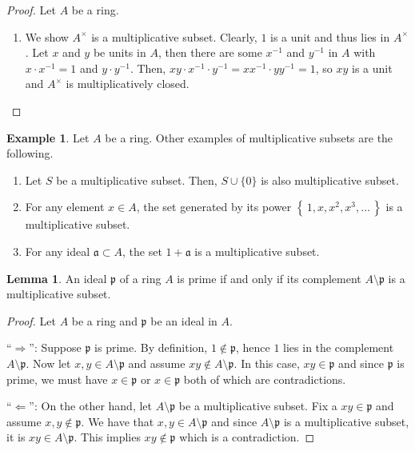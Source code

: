 \documentclass[a4paper]{book}
\theoremstyle{definition}
\newtheorem{example}{Example}[definition]
\newtheorem{lemma}[definition]{Lemma}
\newcommand{\set}[1]{\left\{\, #1 \,\right\}}
\begin{document}
\begin{proof}
    Let \(A\) be a ring.
    \begin{enumerate}
        \item We show \(A^\times\) is a multiplicative subset. Clearly, \(1\) is a unit and thus lies in \(A^\times\). Let \(x\) and \(y\) be units in \(A\), then there are some \(x^{-1}\) and \(y^{-1}\) in \(A\) with \(x \cdot x^{-1} = 1\) and \(y \cdot y^{-1}\). Then, \(xy \cdot x^{-1} \cdot y^{-1} = x x^{-1} \cdot y y^{-1} = 1\), so \(xy\) is a unit and \(A^\times\) is multiplicatively closed.
    \end{enumerate}
\end{proof}

\begin{example}
    Let \(A\) be a ring. Other examples of multiplicative subsets are the following.
    \begin{enumerate}
        \item Let \(S\) be a multiplicative subset. Then, \(S \cup \{0\}\) is also multiplicative subset.
        \item For any element \(x \in A\), the set generated by its power \(\set{1, x, x^2, x^3, \ldots}\) is a multiplicative subset.
        \item For any ideal \(\mathfrak{a} \subset A\), the set \(1 + \mathfrak{a}\) is a multiplicative subset.
    \end{enumerate}
\end{example}

\begin{thmbox}
    \begin{lemma}
        An ideal \(\mathfrak{p}\) of a ring \(A\) is prime if and only if its complement \(A \setminus \mathfrak{p}\) is a multiplicative subset.
    \end{lemma}
\end{thmbox}
\begin{proof}
    Let \(A\) be a ring and \(\mathfrak{p}\) be an ideal in \(A\).

    ``\(\Rightarrow\)'': Suppose \(\mathfrak{p}\) is prime. By definition, \(1 \not\in \mathfrak{p}\), hence \(1\) lies in the complement \(A \setminus \mathfrak{p}\). Now let \(x,y \in A \setminus \mathfrak{p}\) and assume \(xy \not\in A \setminus \mathfrak{p}\). In this case, \(xy \in \mathfrak{p}\) and since \(\mathfrak{p}\) is prime, we must have \(x \in \mathfrak{p}\) or \(x \in \mathfrak{p}\) both of which are contradictions.

    ``\(\Leftarrow\)'': On the other hand, let \(A \setminus \mathfrak{p}\) be a multiplicative subset. Fix a \(xy \in \mathfrak{p}\) and assume \(x, y \not\in \mathfrak{p}\). We have that \(x, y \in A \setminus \mathfrak{p}\) and since \(A \setminus \mathfrak{p}\) is a multiplicative subset, it is \(xy \in A \setminus \mathfrak{p}\). This implies \(xy \not\in \mathfrak{p}\) which is a contradiction.
\end{proof}
\end{document}
